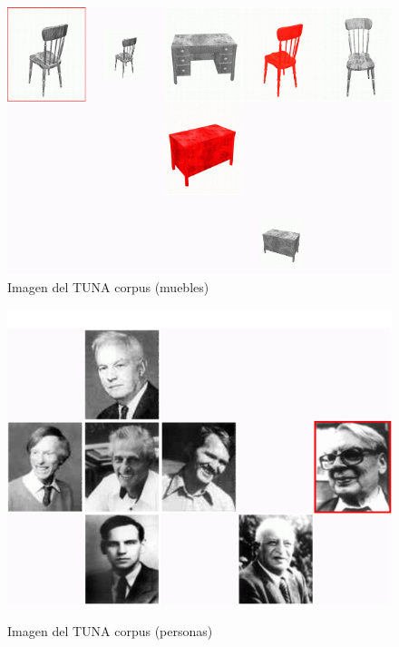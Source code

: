 \begin{figure}[!ht]
\begin{minipage}[c][][b]{0.5\textwidth}
\centering
\includegraphics[width=\textwidth]{images/largeGreyChair.jpg}\\[0pt]
\caption{Imagen del TUNA corpus (muebles)}
\label{fig-TUNA-furniture}
\vspace*{.1cm}
\end{minipage}
\hspace*{0cm}
\begin{minipage}[c][][b]{0.5\textwidth}
\centering
\includegraphics[width=\textwidth]{images/tuna-people.jpg}\\[0pt]
\caption{Imagen del TUNA corpus (personas)}
\label{fig-TUNA-people}
\end{minipage}
\end{figure}


